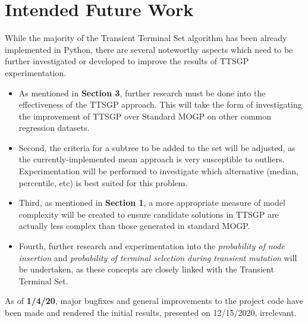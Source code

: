 \documentclass[a4paper]{article}
\begin{document}
\section{Intended Future Work}
While the majority of the Transient Terminal Set algorithm has been already implemented in Python, there are several noteworthy aspects which need to be further investigated or developed to improve the results of TTSGP experimentation. \begin{itemize}
	\item As mentioned in \textbf{Section 3}, further research must be done into the effectiveness of the TTSGP approach. This will take the form of investigating the improvement of TTSGP over Standard MOGP on other common regression datasets.
	\item Second, the criteria for a subtree to be added to the set will be adjusted, as the currently-implemented mean approach is very susceptible to outliers. Experimentation will be performed to investigate which alternative (median, percentile, etc) is best suited for this problem.
	\item Third, as mentioned in \textbf{Section 1}, a more appropriate measure of model complexity will be created to ensure candidate solutions in TTSGP are actually less complex than those generated in standard MOGP.
	\item Fourth, further research and experimentation into the \textit{probability of node insertion} and \textit{probability of terminal selection during transient mutation} will be undertaken, as these concepts are closely linked with the Transient Terminal Set.
\end{itemize}
As of \textbf{1/4/20}, major bugfixes and general improvements to the project code have been made and rendered the initial results, presented on 12/15/2020, irrelevant.
\end{document}
